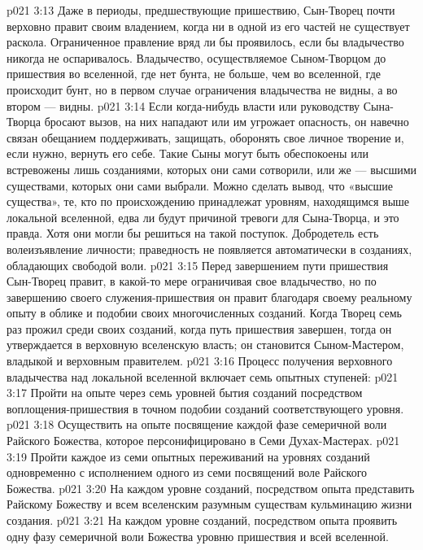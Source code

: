 \vs p021 3:13 Даже в периоды, предшествующие пришествию, Сын\hyp{}Творец почти верховно правит своим владением, когда ни в одной из его частей не существует раскола. Ограниченное правление вряд ли бы проявилось, если бы владычество никогда не оспаривалось. Владычество, осуществляемое Сыном\hyp{}Творцом до пришествия во вселенной, где нет бунта, не больше, чем во вселенной, где происходит бунт, но в первом случае ограничения владычества не видны, а во втором --- видны.
\vs p021 3:14 Если когда\hyp{}нибудь власти или руководству Сына\hyp{}Творца бросают вызов, на них нападают или им угрожает опасность, он навечно связан обещанием поддерживать, защищать, оборонять свое личное творение и, если нужно, вернуть его себе. Такие Сыны могут быть обеспокоены или встревожены лишь созданиями, которых они сами сотворили, или же --- высшими существами, которых они сами выбрали. Можно сделать вывод, что «высшие существа», те, кто по происхождению принадлежат уровням, находящимся выше локальной вселенной, едва ли будут причиной тревоги для Сына\hyp{}Творца, и это правда. Хотя они могли бы решиться на такой поступок. Добродетель есть волеизъявление личности; праведность не появляется автоматически в созданиях, обладающих свободой воли.
\vs p021 3:15 Перед завершением пути пришествия Сын\hyp{}Творец правит, в какой\hyp{}то мере ограничивая свое владычество, но по завершению своего служения\hyp{}пришествия он правит благодаря своему реальному опыту в облике и подобии своих многочисленных созданий. Когда Творец семь раз прожил среди своих созданий, когда путь пришествия завершен, тогда он утверждается в верховную вселенскую власть; он становится Сыном\hyp{}Мастером, владыкой и верховным правителем.
\vs p021 3:16 \pc Процесс получения верховного владычества над локальной вселенной включает семь опытных ступеней:
\vs p021 3:17 \pc {}\bibnobreakspace Пройти на опыте через семь уровней бытия созданий посредством воплощения\hyp{}пришествия в точном подобии созданий соответствующего уровня.
\vs p021 3:18 \pc {}\bibnobreakspace Осуществить на опыте посвящение каждой фазе семеричной воли Райского Божества, которое персонифицировано в Семи Духах\hyp{}Мастерах.
\vs p021 3:19 \pc {}\bibnobreakspace Пройти каждое из семи опытных переживаний на уровнях созданий одновременно с исполнением одного из семи посвящений воле Райского Божества.
\vs p021 3:20 \pc {}\bibnobreakspace На каждом уровне созданий, посредством опыта представить Райскому Божеству и всем вселенским разумным существам кульминацию жизни создания.
\vs p021 3:21 \pc {}\bibnobreakspace На каждом уровне созданий, посредством опыта проявить одну фазу семеричной воли Божества уровню пришествия и всей вселенной.

